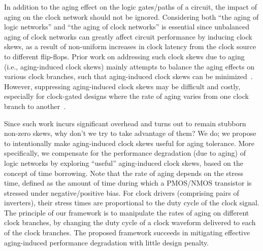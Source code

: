 In addition to the aging effect on the logic gates/paths of a circuit, the impact of aging on the clock network should not be ignored. Considering both \enquote{the aging of logic networks} and \enquote{the aging of clock networks} is essential since unbalanced aging of clock networks can greatly affect circuit performance by inducing clock skews, as a result of non-uniform increases in clock latency from the clock source to different flip-flops. Prior work on addressing such clock skews due to aging (i.e., aging-induced clock skews) mainly attempts to balance the aging effects on various clock branches, such that aging-induced clock skews can be minimized~\cite{chen2013novel, huang2013low, chakraborty2013skew}. However, suppressing aging-induced clock skews may be difficult and costly, especially for clock-gated designs where the rate of aging varies from one clock branch to another~\cite{lai2014bti}.

Since such work incurs significant overhead and turns out to remain stubborn non-zero skews, why don't we try to take advantage of them? We do; we propose to intentionally make aging-induced clock skews useful for aging tolerance. More specifically, we compensate for the performance degradation (due to aging) of logic networks by exploring \enquote{useful} aging-induced clock skews, based on the concept of time borrowing. Note that the rate of aging depends on the stress time, defined as the amount of time during which a PMOS/NMOS transistor is stressed under negative/positive bias. For clock drivers (comprising pairs of inverters), their stress times are proportional to the duty cycle of the clock signal. The principle of our framework is to manipulate the rates of aging on different clock branches, by changing the duty cycle of a clock waveform delivered to each of the clock branches. The proposed framework succeeds in mitigating effective aging-induced performance degradation with little design penalty.

